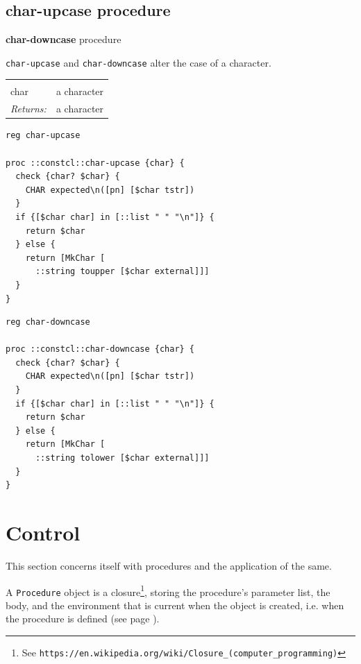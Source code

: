 \documentclass[twoside]{report}
\begin{document}
\subsection{char-upcase procedure}
\label{charupcase-procedure}

\textbf{char-downcase} procedure

\texttt{char-upcase} and \texttt{char-downcase} alter the case of a character.

\noindent\begin{tabular}{ |p{1.9cm} p{8cm}| }
\hline
\rowcolor[HTML]{CCCCCC} \multicolumn{2}{|l|}{\bf char-upcase, char-downcase (public)} \\
char & a character \\
\textit{Returns:} & a character \\
\hline
\end{tabular}

\begin{lstlisting}
reg char-upcase

proc ::constcl::char-upcase {char} {
  check {char? $char} {
    CHAR expected\n([pn] [$char tstr])
  }
  if {[$char char] in [::list " " "\n"]} {
    return $char
  } else {
    return [MkChar [
      ::string toupper [$char external]]]
  }
}
\end{lstlisting}

\begin{lstlisting}
reg char-downcase

proc ::constcl::char-downcase {char} {
  check {char? $char} {
    CHAR expected\n([pn] [$char tstr])
  }
  if {[$char char] in [::list " " "\n"]} {
    return $char
  } else {
    return [MkChar [
      ::string tolower [$char external]]]
  }
}
\end{lstlisting}

\section{Control}
\label{control}

This section concerns itself with procedures and the application of the same.

A \texttt{Procedure} object is a closure\footnote{See \texttt{https://en.wikipedia.org/wiki/Closure\_(computer\_programming)}}, storing the procedure's parameter list, the body, and the environment that is current when the object is created, i.e. when the procedure is defined (see page \pageref{procedure-definition}).
\end{document}
